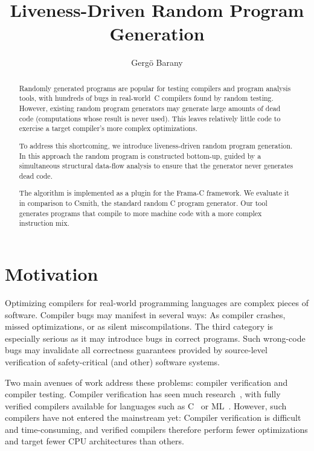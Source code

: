 \documentclass{llncs}
\title{Liveness-Driven Random Program Generation}
\author{Gergö Barany}
\institute{Inria Paris, France \\
           \email{gergo.barany@inria.fr}}
\begin{document}
\maketitle
\thispagestyle{plain}

\begin{abstract}
Randomly generated programs are popular for testing compilers and program
analysis tools, with hundreds of bugs in real-world~C compilers found by
random testing. However, existing random program generators may generate
large amounts of dead code (computations whose result is never used). This
leaves relatively little code to exercise a target compiler's more complex
optimizations.

To address this shortcoming, we introduce liveness-driven random program
generation. In this approach the random program is constructed bottom-up,
guided by a simultaneous structural data-flow analysis to ensure that the
generator never generates dead code.

The algorithm is implemented as a plugin for the Frama-C framework. We
evaluate it in comparison to Csmith, the standard random C program
generator. Our tool generates programs that compile to more machine code
with a more complex instruction mix.
\end{abstract}



\section{Motivation}

Optimizing compilers for real-world programming languages are complex pieces
of software. Compiler bugs may manifest in several ways: As compiler
crashes, missed optimizations, or as silent miscompilations. The third
category is especially serious as it may introduce bugs in correct programs.
Such wrong-code bugs may invalidate all correctness guarantees provided by
source-level verification of safety-critical (and other) software systems.

Two main avenues of work address these problems: compiler verification and
compiler testing. Compiler verification has seen much
research~\cite{dave-2003}, with fully verified compilers available for
languages such as C~\cite{leroy-2009} or ML~\cite{tan-2016}. However, such
compilers have not entered the mainstream yet: Compiler verification is
difficult and time-consuming, and verified compilers therefore perform fewer
optimizations and target fewer CPU architectures than others.
\end{document}

